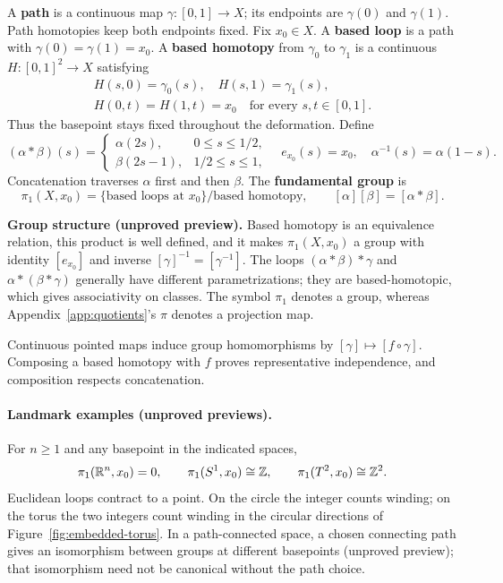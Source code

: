 \begin{definition}
A \textbf{path} is a continuous map $\gamma:[0,1]\to X$; its endpoints
are $\gamma(0)$ and $\gamma(1)$. Path homotopies keep both endpoints fixed.
Fix $x_0\in X$. A \textbf{based loop} is a path with
$\gamma(0)=\gamma(1)=x_0$. A \textbf{based homotopy} from $\gamma_0$
to $\gamma_1$ is a continuous $H:[0,1]^2\to X$ satisfying
\[
\begin{gathered}
H(s,0)=\gamma_0(s),\quad H(s,1)=\gamma_1(s),\\
H(0,t)=H(1,t)=x_0\quad\text{for every }s,t\in[0,1].
\end{gathered}
\]
Thus the basepoint stays fixed throughout the deformation. Define
\[
(\alpha*\beta)(s)=
\begin{cases}\alpha(2s),&0\leq s\leq1/2,\\
\beta(2s-1),&1/2\leq s\leq1,
\end{cases}
\quad e_{x_0}(s)=x_0,\quad \alpha^{-1}(s)=\alpha(1-s).
\]
Concatenation traverses $\alpha$ first and then $\beta$. The
\textbf{fundamental group} is
\[
\pi_1(X,x_0)=\{\text{based loops at }x_0\}/\text{based homotopy},
\qquad [\alpha][\beta]=[\alpha*\beta].
\]
\end{definition}
\textbf{Group structure (unproved preview).} Based homotopy is an
equivalence relation, this product is well defined, and it makes
$\pi_1(X,x_0)$ a group with identity $[e_{x_0}]$ and inverse
$[\gamma]^{-1}=[\gamma^{-1}]$. The loops $(\alpha*\beta)*\gamma$ and
$\alpha*(\beta*\gamma)$ generally have different parametrizations;
they are based-homotopic, which gives associativity on classes.
The symbol $\pi_1$ denotes a group, whereas Appendix~\ref{app:quotients}'s $\pi$ denotes
a projection map.

Continuous pointed maps induce group homomorphisms by
$[\gamma]\mapsto[f\circ\gamma]$. Composing a based homotopy with $f$
proves representative independence, and composition respects concatenation.

\paragraph{Landmark examples (unproved previews).}
For $n\geq1$ and any basepoint in the indicated spaces,
\[
\pi_1(\mathbb{R}^n,x_0)=0,\qquad \pi_1(S^1,x_0)\cong\mathbb{Z},\qquad
\pi_1(T^2,x_0)\cong\mathbb{Z}^2.
\]
Euclidean loops contract to a point. On the circle the integer counts
winding; on the torus the two integers count winding in the circular
directions of Figure~\ref{fig:embedded-torus}. In a path-connected space,
a chosen connecting path gives an isomorphism between groups at different
basepoints (unproved preview); that isomorphism need not be canonical
without the path choice.

